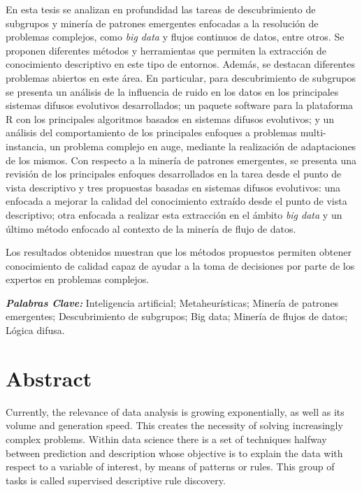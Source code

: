 \documentclass[c5paper,10pt,twoside]{book}	   	%
\begin{document}
En esta tesis se analizan en profundidad las tareas de descubrimiento de subgrupos y minería de patrones emergentes enfocadas a la resolución de problemas complejos, como \textit{big data} y flujos continuos de datos, entre otros. Se proponen diferentes métodos y herramientas que permiten la extracción de conocimiento descriptivo en este tipo de entornos. Además, se destacan diferentes problemas abiertos en este área. En particular, para descubrimiento de subgrupos se presenta un análisis de la influencia de ruido en los datos en los principales sistemas difusos evolutivos desarrollados; un paquete software para la plataforma R con los principales algoritmos basados en sistemas difusos evolutivos; y un análisis del comportamiento de los principales enfoques  a problemas multi-instancia, un problema complejo en auge, mediante la realización de adaptaciones de los mismos. Con respecto a la minería de patrones emergentes, se presenta una revisión de los principales enfoques desarrollados en la tarea desde el punto de vista descriptivo y tres propuestas basadas en sistemas difusos evolutivos: una enfocada a mejorar la calidad del conocimiento extraído desde el punto de vista descriptivo; otra enfocada a realizar esta extracción en el ámbito \textit{big data} y un último método enfocado al contexto de la minería de flujo de datos.

Los resultados obtenidos muestran que los métodos propuestos permiten obtener conocimiento de calidad capaz de ayudar a la toma de decisiones por parte de los expertos en problemas complejos.



\vspace{7.5mm}

\textbf{\textit{Palabras Clave: }} Inteligencia artificial; Metaheurísticas;  Minería de patrones emergentes; Descubrimiento de subgrupos; Big data; Minería de flujos de datos; Lógica difusa.


\cleardoublepage

\chapter*{Abstract} 

Currently, the relevance of data analysis is growing exponentially, as well as its volume and generation speed. This creates the necessity of solving increasingly complex problems. Within data science there is a set of techniques halfway between prediction and description whose objective is to explain the data with respect to a variable of interest, by means of patterns or rules. This group of tasks is called supervised descriptive rule discovery.
\end{document}
